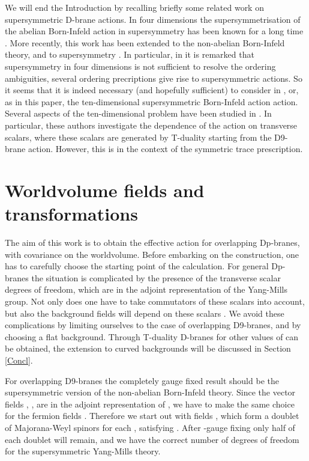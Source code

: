 \documentclass[12pt,a4paper]{article}
\begin{document}
We will end the Introduction by recalling briefly some
related work on supersymmetric D-brane actions. In four
dimensions the supersymmetrisation of the abelian Born-Infeld
action in \coordHE{} supersymmetry has been known for a long time
\cite{CF}. More recently, this work has been extended
to the non-abelian Born-Infeld theory, and to \coordHE{}
supersymmetry \cite{K2,RTZ}. In particular, in \cite{K2} it
is remarked that \coordHE{} supersymmetry in four dimensions is
not sufficient to resolve the ordering ambiguities, several
ordering precriptions give rise to supersymmetric actions.
So it seems that it is indeed necessary (and hopefully
sufficient) to consider \coordHE{} in \coordHE{}, or, as in this
paper, the ten-dimensional supersymmetric Born-Infeld action
action. Several aspects of the ten-dimensional problem have
been studied in \cite{TR, M}. In particular, these authors
investigate the dependence of the action on transverse scalars,
where these scalars are generated by T-duality starting from the
D9-brane action. However, this is in the context of the symmetric
trace prescription.

\section{Worldvolume fields and transformations\label{Fields}}

The aim of this work is to obtain the effective action for \coordHE{}
overlapping Dp-branes, with \coordHE{} covariance on the worldvolume.
Before embarking on the construction, one has to carefully choose
the starting
point of the calculation. For  general Dp-branes  the situation is
complicated by the presence of the transverse scalar degrees of freedom,
which are in the adjoint representation of the Yang-Mills group. Not only
does one have to take commutators of these scalars into account, but also
the background fields will depend on these scalars \cite{D}. We avoid
these complications by limiting ourselves to the case of \coordHE{} overlapping
D9-branes, and by choosing a  flat background. Through T-duality
D-branes for other values of \coordHE{} can be obtained,
the extension to curved backgrounds
will be discussed in Section \ref{Concl}.

For \coordHE{} overlapping D9-branes the completely gauge fixed result
should be the supersymmetric version of the non-abelian Born-Infeld
theory. Since the vector fields \coordHE{}, \coordHE{},
are in the adjoint representation of \coordHE{}, we have to
make the same choice for the fermion fields \myHighlight{$\theta$}\coordHE{}.
Therefore we start out with fields \coordHE{},
which form a doublet
\coordHE{} of Majorana-Weyl spinors for each \coordHE{},
satisfying \coordHE{}. After \myHighlight{$\kappa$}\coordHE{}-gauge fixing
only half of each doublet will remain, and we have the
correct number of degrees of freedom for the supersymmetric Yang-Mills
theory.
\end{document}
